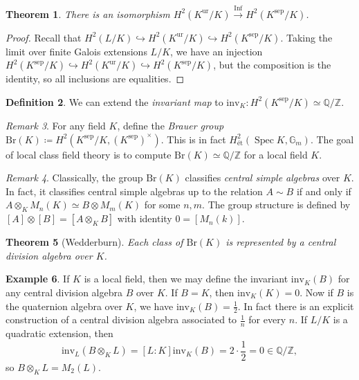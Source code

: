 \documentclass[leqno, openany]{memoir}
\newtheorem{thm}{Theorem}[section]
\theoremstyle{definition}
\newtheorem{defn}[thm]{Definition}
\newtheorem{exm}[thm]{Example}
\theoremstyle{remark}
\newtheorem{rmk}[thm]{Remark}
\theoremstyle{plain}
\theoremstyle{definition}
\theoremstyle{remark}
\newcommand{\Z}{\mathbb{Z}}
\newcommand{\Q}{\mathbb{Q}}
\newcommand{\mr}[1]{\mathrm{#1}}
\DeclareMathOperator{\Spec}{Spec}
\DeclareMathOperator{\Inf}{Inf}
\begin{document}
\begin{thm}
    There is an isomorphism $H^2(K^{\mr{ur}}/K) \xrightarrow{\Inf} H^2(K^{\mr{sep}}/K)$.
\end{thm}

\begin{proof}
    Recall that $H^2(L/K) \hookrightarrow H^2(K^{\mr{ur}}/K) \hookrightarrow H^2(K^{\mr{sep}}/K)$. Taking the limit over finite Galois extensions $L/K$, we have an injection $H^2(K^{\mr{sep}}/K) \hookrightarrow H^2(K^{\mr{ur}}/K) \hookrightarrow H^2(K^{\mr{sep}}/K)$, but the composition is the identity, so all inclusions are equalities.
\end{proof}

\begin{defn}
    We can extend the \textit{invariant map} to $\mr{inv}_K \colon H^2(K^{\mr{sep}}/K) \simeq \Q/\Z$. 
\end{defn}

\begin{rmk}
    For any field $K$, define the \textit{Brauer group} $\mr{Br}(K) \coloneqq H^2(K^{\mr{sep}}/K, {(K^{\mr{sep}})}^{\times})$. This is in fact $H^2_{\text{\'et}}(\Spec K, \mathbb{G}_m)$. The goal of local class field theory is to compute $\mr{Br}(K) \simeq \Q/\Z$ for a local field $K$.
\end{rmk}

\begin{rmk}
    Classically, the group $\mr{Br}(K)$ classifies \textit{central simple algebras} over $K$. In fact, it classifies central simple algebras up to the relation $A \sim B$ if and only if $A \otimes_K M_n(K) \simeq B \otimes M_m(K)$ for some $n, m$. The group structure is defined by $[A] \otimes [B] = [A \otimes_K B]$ with identity $0 = [M_n(k)]$.
\end{rmk}

\begin{thm}[Wedderburn]
    Each class of $\mr{Br}(K)$ is represented by a central division algebra over $K$.
\end{thm}

\begin{exm}
    If $K$ is a local field, then we may define the invariant $\mr{inv}_K(B)$ for any central division algebra $B$ over $K$. If $B = K$, then $\mr{inv}_K(K) = 0$. Now if $B$ is the quaternion algebra over $K$, we have $\mr{inv}_K(B) = \frac{1}{2}$. In fact there is an explicit construction of a central division algebra associated to $\frac{1}{n}$ for every $n$. If $L/K$ is a quadratic extension, then
    \[ \mr{inv}_L(B \otimes_K L) = [L:K] \mr{inv}_K(B) = 2 \cdot \frac{1}{2} = 0 \in \Q/\Z, \]
    so $B \otimes_K L = M_2(L)$.
\end{exm}
\end{document}
